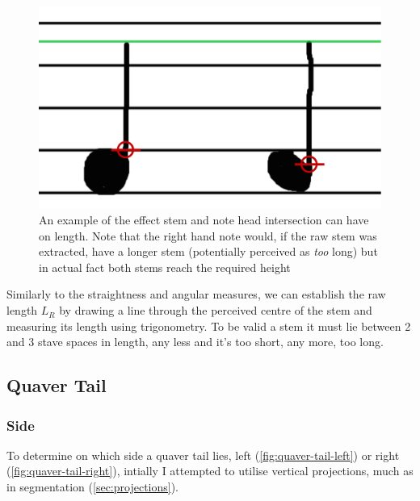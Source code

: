 \begin{figure}[h!]
    \centering
    \includegraphics[width=.8\textwidth]{gfx/techniques/stem-intersection-labelled.png}
    \caption{An example of the effect stem and note head intersection can have on length. Note that the right hand note would, if the raw stem was extracted, have a longer stem (potentially perceived as \emph{too} long) but in actual fact both stems reach the required height}
    \label{fig:stem-intersection}
\end{figure}

Similarly to the straightness and angular measures, we can establish the raw length $L_R$ by drawing a line through the perceived centre of the stem and measuring its length using trigonometry. To be valid a stem it must lie between 2 and 3 stave spaces in length, any less and it's too short, any more, too long.

\subsection{Quaver Tail}

\subsubsection{Side}\label{sec:scoring-quaver-tail-side}

To determine on which side a quaver tail lies, left (\cref{fig:quaver-tail-left}) or right (\cref{fig:quaver-tail-right}), intially I attempted to utilise vertical projections, much as in segmentation (\cref{sec:projections}).

